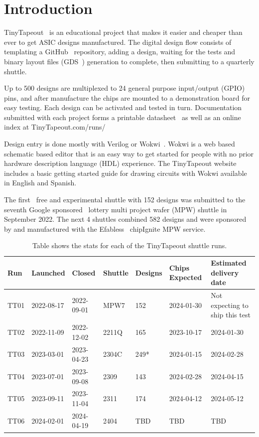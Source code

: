 \section{Introduction}
\label{sec:introduction}
TinyTapeout~\cite{tinytapeout} is an educational project that makes it easier and cheaper than ever to get ASIC designs manufactured.
The digital design flow consists of templating a GitHub~\cite{github} repository, adding a design, waiting for the tests and binary layout files (GDS~\cite{gds}) generation to complete, then submitting to a quarterly shuttle.

Up to 500 designs are multiplexed to 24 general purpose input/output (GPIO) pins, and after manufacture the chips are mounted to a demonstration board for easy testing.
Each design can be activated and tested in turn.
Documentation submitted with each project forms a printable datasheet~\cite{datasheet} as well as an online index at TinyTapeout.com/runs/~\cite{tinytapeoutruns}

Design entry is done mostly with Verilog or Wokwi~\cite{wokwi}.
Wokwi is a web based schematic based editor that is an easy way to get started for people with no prior hardware description language (HDL) experience.
The TinyTapeout website includes a basic getting started guide for drawing circuits with Wokwi available in English and Spanish.

The first~\cite{firstshuttle} free and experimental shuttle with 152 designs was submitted to the seventh Google sponsored~\cite{googlesponsored} lottery multi project wafer (MPW) shuttle in September 2022.
The next 4 shuttles combined 582 designs and were sponsored by and manufactured with the Efabless~\cite{efabless} chipIgnite MPW service.

\begin{table}[htbp]
\centering
\caption{Table shows the stats for each of the TinyTapeout shuttle runs.}
\label{tab:tinytapeout}
\begin{tabularx}{\textwidth}{@{}l *{6}{X}@{}}
\toprule
\textbf{Run} & \textbf{Launched} & \textbf{Closed} & \textbf{Shuttle} & \textbf{Designs} & \textbf{Chips Expected} & \textbf{Estimated delivery date} \\
\midrule
TT01 & 2022-08-17 & 2022-09-01 & MPW7  & 152 & 2024-01-30 & Not expecting to ship this test \\
TT02 & 2022-11-09 & 2022-12-02 & 2211Q & 165 & 2023-10-17 & 2024-01-30 \\
TT03 & 2023-03-01 & 2023-04-23 & 2304C & 249* & 2024-01-15 & 2024-02-28 \\
TT04 & 2023-07-01 & 2023-09-08 & 2309  & 143 & 2024-02-28 & 2024-04-15 \\
TT05 & 2023-09-11 & 2023-11-04 & 2311  & 174 & 2024-04-12 & 2024-05-12 \\
TT06 & 2024-02-01 & 2024-04-19 & 2404  & TBD & TBD        & TBD \\
\bottomrule
\end{tabularx}
\end{table}

